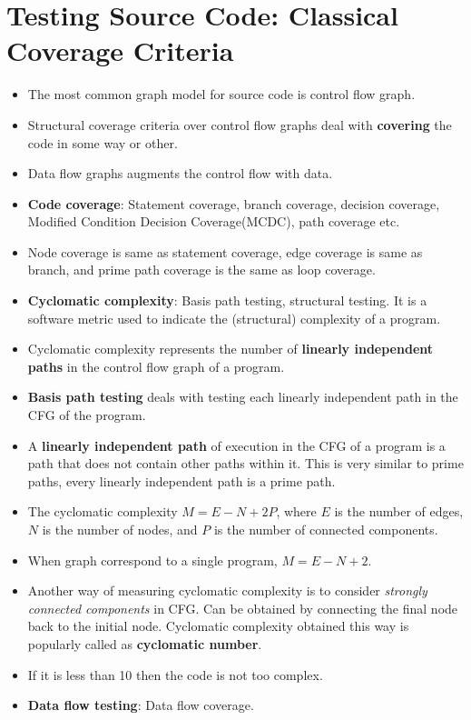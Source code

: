 \documentclass[a4paper]{article}
\begin{document}
\section{Testing Source Code: Classical Coverage Criteria}
\begin{itemize}
    \item The most common graph model for source code is control flow graph.
    \item Structural coverage criteria over control flow graphs deal with \textbf{covering} the code in some way or other.
    \item Data flow graphs augments the control flow with data.
    \item \textbf{Code coverage}: Statement coverage, branch coverage, decision coverage, Modified Condition Decision Coverage(MCDC), path coverage etc.
    \item Node coverage is same as statement coverage, edge coverage is same as branch, and prime path coverage is the same as loop coverage.
    \item \textbf{Cyclomatic complexity}: Basis path testing, structural testing. It is a software metric used to indicate the (structural) complexity of a program.
    \item Cyclomatic complexity represents the number of \textbf{linearly independent paths} in the control flow graph of a program.
    \item \textbf{Basis path testing} deals with testing each linearly independent path in the CFG of the program.
    \item A \textbf{linearly independent path} of execution in the CFG of a program is a path that does not contain other paths within it. This is very similar to prime paths, every linearly independent path is a prime path.
    \item The cyclomatic complexity $M=E-N+2P$, where $E$ is the number of edges, $N$ is the number of nodes, and $P$ is the number of connected components.
    \item When graph correspond to a single program, $M=E-N+2$.
    \item Another way of measuring cyclomatic complexity is to consider \textit{strongly connected components} in CFG. Can be obtained by connecting the final node back to the initial node. Cyclomatic complexity obtained this way is popularly called as \textbf{cyclomatic number}.
    \item If it is less than 10 then the code is not too complex.
    \item \textbf{Data flow testing}: Data flow coverage.

\end{itemize}
\end{document}
